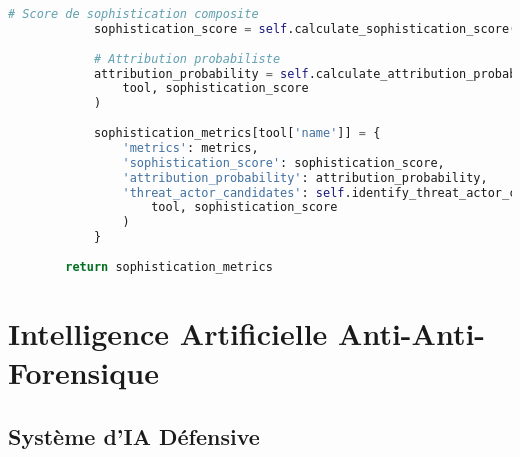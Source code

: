 \begin{lstlisting}[language=Python, caption=Détecteur d'outils anti-forensique]
            # Score de sophistication composite
            sophistication_score = self.calculate_sophistication_score(metrics)
            
            # Attribution probabiliste
            attribution_probability = self.calculate_attribution_probability(
                tool, sophistication_score
            )
            
            sophistication_metrics[tool['name']] = {
                'metrics': metrics,
                'sophistication_score': sophistication_score,
                'attribution_probability': attribution_probability,
                'threat_actor_candidates': self.identify_threat_actor_candidates(
                    tool, sophistication_score
                )
            }
            
        return sophistication_metrics
\end{lstlisting}

\section{Intelligence Artificielle Anti-Anti-Forensique}

\subsection{Système d'IA Défensive}

